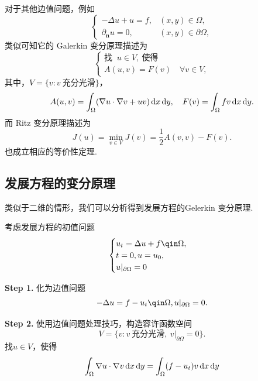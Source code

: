 对于其他边值问题，例如
\begin{equation*}
    \begin{cases}
        -\Delta u + u = f, & (x, y) \in \Omega, \\
        \partial_{\bm{n}} u = 0, & (x, y) \in \partial\Omega,
    \end{cases}
\end{equation*}
类似可知它的 Galerkin 变分原理描述为
\begin{equation*}
    \begin{cases}
        \text{找 }\ u \in V,\ \text{使得} \\
        A(u, v) = F(v) \quad \forall v \in V,
    \end{cases}
\end{equation*}
其中，$V = \{v : v\ \text{充分光滑}\}$，
\begin{equation*}
    A(u, v) = \int_{\Omega} (\nabla u \cdot \nabla v + uv) \mathop{}\!\mathrm{d} x\mathop{}\!\mathrm{d} y, \quad F(v) = \int_{\Omega} f v \mathop{}\!\mathrm{d} x\mathop{}\!\mathrm{d} y.
\end{equation*}
而 Ritz 变分原理描述为
\begin{equation*}
    J(u) = \min_{v \in V} J(v) = \frac{1}{2} A(v, v) - F(v).
\end{equation*}
也成立相应的等价性定理.

\subsection{发展方程的变分原理}
类似于二维的情形，我们可以分析得到发展方程的Gelerkin 变分原理.\par
考虑发展方程的初值问题
\begin{equation*}
    \begin{cases}
        u_t=\Delta u+f \qin \Omega, \\
        t=0,u=u_0,\\
        u|_{\partial\Omega}=0
    \end{cases}
\end{equation*}

\noindent\textbf{Step 1.} 化为边值问题
\begin{equation*}
    -\Delta u=f-u_t \qin \Omega,\\
    u|_{\partial\Omega}=0.
\end{equation*}

\noindent\textbf{Step 2.} 使用边值问题处理技巧，构造容许函数空间
\begin{equation*}
    V=\{v:v\ \text{充分光滑},\ v|_{\partial\Omega}=0\}.
\end{equation*}
找$u\in V$，使得
\begin{equation*}
    \int_\Omega \nabla u\cdot\nabla v \mathop{}\!\mathrm{d} x\mathop{}\!\mathrm{d} y=\int_\Omega (f-u_t)v\mathop{}\!\mathrm{d} x\mathop{}\!\mathrm{d} y
\end{equation*}

